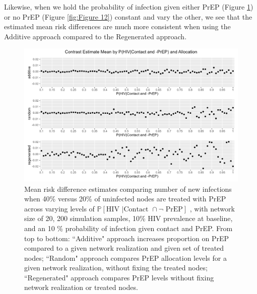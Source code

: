 \documentclass{article}
\theoremstyle{definition}
\begin{document}
Likewise, when we hold the probability of infection given either PrEP (Figure \ref{fig:Figure 11}) or no PrEP (Figure \ref{fig:Figure 12}) constant and vary the other, we see that the estimated mean risk differences are much more consistent when using the Additive approach compared to the Regenerated approach. 


\begin{figure}[H]
    \centering
    \includegraphics[width=\linewidth]{Figures/p1 Mean plots.png}
    \caption{Mean risk difference estimates comparing number of new infections when 40\% versus 20\% of uninfected nodes are treated with PrEP across varying levels of  $\mathbb{P}\left[\text{HIV } \vert \text {Contact } \cap \neg \text{ PrEP}\right]$ , with network size of 20,  200 simulation samples,  10\% HIV prevalence at baseline, and an 10 \% probability of infection given contact and PrEP.
    From top to bottom: ``Additive" approach increases proportion on PrEP compared to a given network realization and given set of treated nodes; ``Random" approach compares PrEP allocation levels for a given network realization, without fixing the treated nodes; ``Regenerated" approach compares PrEP levels without fixing network realization or treated nodes.}
    \label{fig:Figure 11}
\end{figure}
\end{document}
